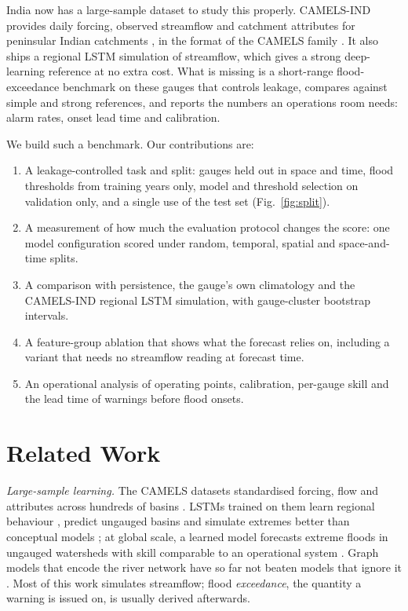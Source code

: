 \documentclass[conference]{IEEEtran}
\begin{document}
India now has a large-sample dataset to study this properly. CAMELS-IND provides daily forcing, observed streamflow and catchment attributes for peninsular Indian catchments \cite{Mangukiya2025}, in the format of the CAMELS family \cite{Newman2015,Addor2017}. It also ships a regional LSTM simulation of streamflow, which gives a strong deep-learning reference at no extra cost. What is missing is a short-range flood-exceedance benchmark on these gauges that controls leakage, compares against simple and strong references, and reports the numbers an operations room needs: alarm rates, onset lead time and calibration.

We build such a benchmark. Our contributions are:
\begin{enumerate}
\item A leakage-controlled task and split: gauges held out in space and time, flood thresholds from training years only, model and threshold selection on validation only, and a single use of the test set (Fig.~\ref{fig:split}).
\item A measurement of how much the evaluation protocol changes the score: one model configuration scored under random, temporal, spatial and space-and-time splits.
\item A comparison with persistence, the gauge's own climatology and the CAMELS-IND regional LSTM simulation, with gauge-cluster bootstrap intervals.
\item A feature-group ablation that shows what the forecast relies on, including a variant that needs no streamflow reading at forecast time.
\item An operational analysis of operating points, calibration, per-gauge skill and the lead time of warnings before flood onsets.
\end{enumerate}

\section{Related Work}
\textit{Large-sample learning.} The CAMELS datasets standardised forcing, flow and attributes across hundreds of basins \cite{Newman2015,Addor2017}. LSTMs trained on them learn regional behaviour \cite{Kratzert2019a}, predict ungauged basins \cite{Kratzert2019b} and simulate extremes better than conceptual models \cite{Frame2022}; at global scale, a learned model forecasts extreme floods in ungauged watersheds with skill comparable to an operational system \cite{Nearing2024}. Graph models that encode the river network have so far not beaten models that ignore it \cite{Kirschstein2024}. Most of this work simulates streamflow; flood \emph{exceedance}, the quantity a warning is issued on, is usually derived afterwards.
\end{document}
